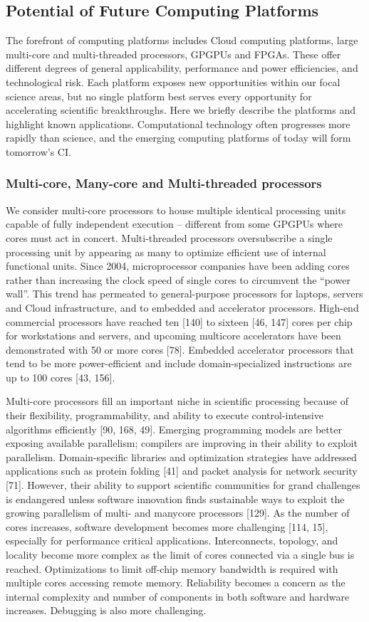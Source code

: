 \subsection{Potential of Future Computing Platforms}
The forefront of computing platforms includes Cloud computing platforms, large multi-core and
multi-threaded processors, GPGPUs and FPGAs. These offer different degrees of general applicability,
performance and power efficiencies, and technological risk. Each platform exposes new
opportunities within our focal science areas, but no single platform best serves every opportunity
for accelerating scientific breakthroughs. Here we briefly describe the platforms and highlight
known applications. Computational technology often progresses more rapidly than science, and the
emerging computing platforms of today will form tomorrow’s CI.

\subsubsection{Multi-core, Many-core and Multi-threaded processors}
We consider multi-core processors to house multiple identical processing units capable of fully
independent execution – different from some GPGPUs where cores must act in concert. Multi-threaded processors oversubscribe a single processing unit by appearing as many to optimize
efficient use of internal functional units. Since 2004, microprocessor companies have been adding
cores rather than increasing the clock speed of single cores to circumvent the “power wall”. This
trend has permeated to general-purpose processors for laptops, servers and Cloud infrastructure, and
to embedded and accelerator processors. High-end commercial processors have reached ten [140] to
sixteen [46, 147] cores per chip for workstations and servers, and upcoming multicore accelerators
have been demonstrated with 50 or more cores [78]. Embedded accelerator processors that tend to
be more power-efficient and include domain-specialized instructions are up to 100 cores [43, 156].

Multi-core processors fill an important niche in scientific processing because of their flexibility,
programmability, and ability to execute control-intensive algorithms efficiently [90, 168, 49].
Emerging programming models are better exposing available parallelism; compilers are improving
in their ability to exploit parallelism. Domain-specific libraries and optimization strategies have
addressed applications such as protein folding [41] and packet analysis for network security [71].
However, their ability to support scientific communities for grand challenges is endangered unless
software innovation finds sustainable ways to exploit the growing parallelism of multi- and manycore
processors [129]. As the number of cores increases, software development becomes more
challenging [114, 15], especially for performance critical applications. Interconnects, topology,
and locality become more complex as the limit of cores connected via a single bus is reached.
Optimizations to limit off-chip memory bandwidth is required with multiple cores accessing remote
memory. Reliability becomes a concern as the internal complexity and number of components in
both software and hardware increases. Debugging is also more challenging.

